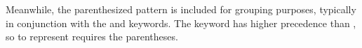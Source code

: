 \begin{figure}[H]
    \centering
    \parbox[t]{0.4\linewidth}{
        \begin{prooftree}
        \end{prooftree}
    }
    \parbox[t]{0.4\linewidth}{
        \begin{prooftree}
        \end{prooftree}
    }
\end{figure}

Meanwhile, the parenthesized pattern is included for grouping purposes,
typically in conjunction with the  and  keywords. The
 keyword has higher precedence than , so to represent
 requires the parentheses.

\begin{prooftree}
\end{prooftree}
